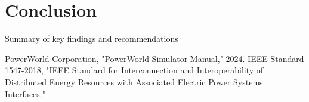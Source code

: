 \documentclass[conference]{IEEEtran}
\begin{document}
\section{Conclusion}
Summary of key findings and recommendations
	
\begin{thebibliography}{00}
	 PowerWorld Corporation, "PowerWorld Simulator Manual," 2024.
	 IEEE Standard 1547-2018, "IEEE Standard for Interconnection and Interoperability of Distributed Energy Resources with Associated Electric Power Systems Interfaces."
\end{thebibliography}
\end{document}
